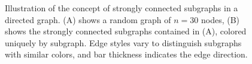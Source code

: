 \documentclass[11pt]{article}
\begin{document}
\begin{figure}[ht]
\centering
{}
\caption{Illustration of the concept of strongly connected subgraphs in a directed graph.  (A) shows a 
random graph of $n=30$ nodes, (B) shows the strongly connected subgraphs contained in (A), colored 
uniquely by subgraph.  Edge styles vary to distinguish subgraphs with similar colors, and bar thickness 
indicates the edge direction.}
\label{f:graphs}
\end{figure}
\end{document}

